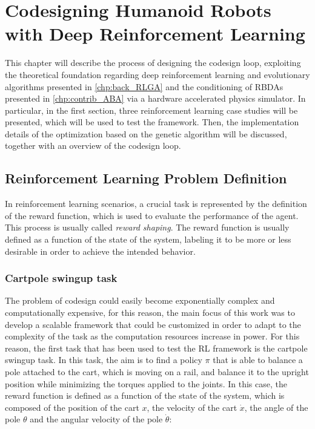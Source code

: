 \chapter{Codesigning Humanoid Robots with Deep Reinforcement Learning}
\label{chp:contrib_CodesignRL}

This chapter will describe the process of designing the codesign loop, exploiting the theoretical foundation regarding deep reinforcement learning and evolutionary algorithms presented in \cref{chp:back_RLGA} and the conditioning of \ac{RBDA}s presented in \cref{chp:contrib_ABA} via a hardware accelerated physics simulator. In particular, in the first section, three reinforcement learning case studies will be presented, which will be used to test the framework. Then, the implementation details of the optimization based on the genetic algorithm will be discussed, together with an overview of the codesign loop.

\section{Reinforcement Learning Problem Definition}

In reinforcement learning scenarios, a crucial task is represented by the definition of the reward function, which is used to evaluate the performance of the agent. This process is usually called \textit{reward shaping}. The reward function is usually defined as a function of the state of the system, labeling it to be more or less desirable in order to achieve the intended behavior.

\subsection{Cartpole swingup task}

The problem of codesign could easily become exponentially complex and computationally expensive, for this reason, the main focus of this work was to develop a scalable framework that could be customized in order to adapt to the complexity of the task as the computation resources increase in power. For this reason, the first task that has been used to test the \ac{RL} framework is the cartpole swingup task. In this task, the aim is to find a policy $\pi$ that is able to balance a pole attached to the cart, which is moving on a rail, and balance it to the upright position while minimizing the torques applied to the joints. In this case, the reward function is defined as a function of the state of the system, which is composed of the position of the cart $x$, the velocity of the cart $\dot{x}$, the angle of the pole $\theta$ and the angular velocity of the pole $\dot{\theta}$:

